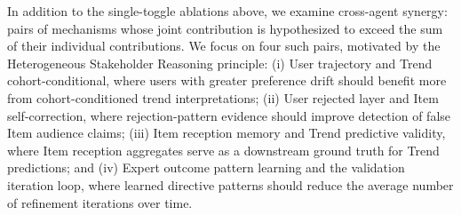 \documentclass[master,english,final]{postech-ucs}
\begin{document}
\begin{table}[htbp]
\caption{Ablation of per-agent reasoning mechanisms on the Amazon Clothing primary dataset. ``Full'' denotes the full MARGO configuration with all toggles on. Each subsequent row sets the indicated toggle to off while keeping all others on, isolating the contribution of that mechanism. Values to be populated upon completion of Phase E evaluation.}
\label{tab:ablation_results}
\centering
{}
\end{table}

In addition to the single-toggle ablations above, we examine cross-agent synergy: pairs of mechanisms whose joint contribution is hypothesized to exceed the sum of their individual contributions.
We focus on four such pairs, motivated by the Heterogeneous Stakeholder Reasoning principle: (i) User trajectory and Trend cohort-conditional, where users with greater preference drift should benefit more from cohort-conditioned trend interpretations; (ii) User rejected layer and Item self-correction, where rejection-pattern evidence should improve detection of false Item audience claims; (iii) Item reception memory and Trend predictive validity, where Item reception aggregates serve as a downstream ground truth for Trend predictions; and (iv) Expert outcome pattern learning and the validation iteration loop, where learned directive patterns should reduce the average number of refinement iterations over time.
\end{document}
